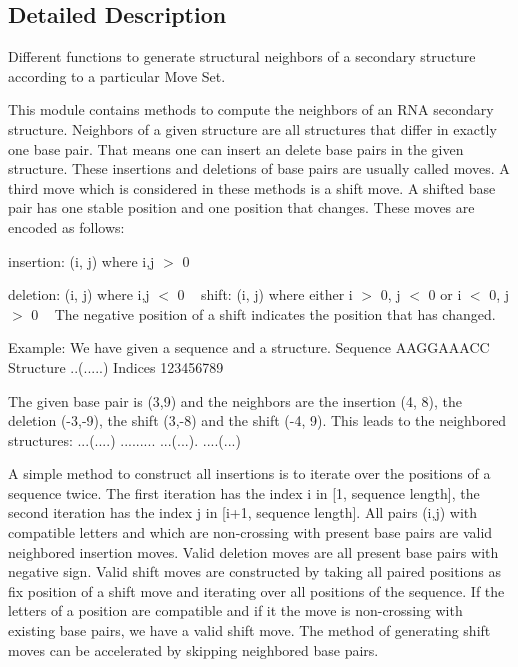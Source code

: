 \subsection{Detailed Description}
Different functions to generate structural neighbors of a secondary structure according to a particular Move Set. 

This module contains methods to compute the neighbors of an R\+NA secondary structure. Neighbors of a given structure are all structures that differ in exactly one base pair. That means one can insert an delete base pairs in the given structure. These insertions and deletions of base pairs are usually called moves. A third move which is considered in these methods is a shift move. A shifted base pair has one stable position and one position that changes. These moves are encoded as follows\+: ~\newline

\begin{DoxyItemize}
\item insertion\+: (i, j) where i,j $>$ 0 ~\newline

\item deletion\+: (i, j) where i,j $<$ 0 ~\newline
 shift\+: (i, j) where either i $>$ 0, j $<$ 0 or i $<$ 0, j $>$ 0 ~\newline
 The negative position of a shift indicates the position that has changed.
\end{DoxyItemize}


\begin{DoxyCode}
Example:
         We have given a sequence and a structure.
         Sequence  AAGGAAACC
         Structure ..(.....)
         Indices   123456789

         The given base pair is (3,9) and the neighbors are the insertion (4, 8), the deletion (-3,-9), the
       shift (3,-8)
         and the shift (-4, 9).
         This leads to the neighbored structures:
         ...(....)
         .........
         ...(...).
         ....(...)
\end{DoxyCode}


A simple method to construct all insertions is to iterate over the positions of a sequence twice. The first iteration has the index i in \mbox{[}1, sequence length\mbox{]}, the second iteration has the index j in \mbox{[}i+1, sequence length\mbox{]}. All pairs (i,j) with compatible letters and which are non-\/crossing with present base pairs are valid neighbored insertion moves. Valid deletion moves are all present base pairs with negative sign. Valid shift moves are constructed by taking all paired positions as fix position of a shift move and iterating over all positions of the sequence. If the letters of a position are compatible and if it the move is non-\/crossing with existing base pairs, we have a valid shift move. The method of generating shift moves can be accelerated by skipping neighbored base pairs.

